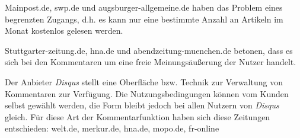 Mainpost.de, swp.de und augsburger-allgemeine.de haben das Problem eines begrenzten
Zugangs, d.h. es kann nur eine bestimmte Anzahl an Artikeln im Monat kostenlos gelesen werden. 

Stuttgarter-zeitung.de, hna.de und abendzeitung-muenchen.de betonen, dass es sich bei den Kommentaren um eine freie 
Meinungsäußerung der Nutzer handelt. 

Der Anbieter {\slshape Disqus} stellt eine Oberfläche bzw. Technik zur Verwaltung von Kommentaren zur Verfügung. 
Die Nutzungsbedingungen können vom Kunden selbst gewählt werden, die Form bleibt jedoch 
bei allen Nutzern von {\slshape Disqus} gleich. Für diese Art der Kommentarfunktion haben sich diese
Zeitungen entschieden: welt.de, merkur.de, hna.de, mopo.de, fr-online










